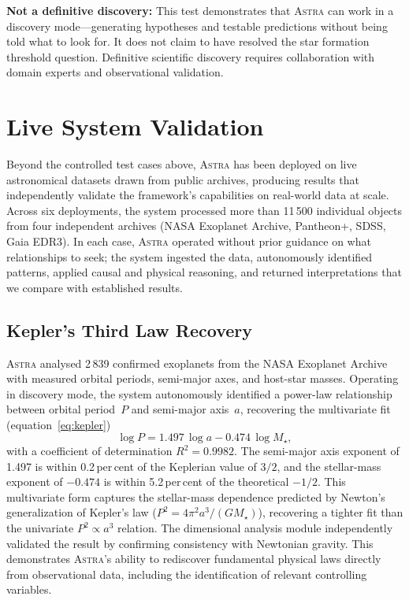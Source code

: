 \documentclass[usenatbib]{rasti}
\newcommand{\astra}{\textsc{Astra}\xspace}
\begin{document}
\textbf{Not a definitive discovery:}
This test demonstrates that \astra can work in a discovery mode---generating hypotheses and testable predictions without being told what to look for.
It does not claim to have resolved the star formation threshold question.
Definitive scientific discovery requires collaboration with domain experts and observational validation.

\section{Live System Validation}
\label{sec:live}

Beyond the controlled test cases above, \astra has been deployed on live astronomical datasets drawn from public archives, producing results that independently validate the framework's capabilities on real-world data at scale.
Across six deployments, the system processed more than 11\,500 individual objects from four independent archives (NASA Exoplanet Archive, Pantheon+, SDSS, Gaia EDR3).
In each case, \astra operated without prior guidance on what relationships to seek; the system ingested the data, autonomously identified patterns, applied causal and physical reasoning, and returned interpretations that we compare with established results.

\subsection{Kepler's Third Law Recovery}
\label{sec:live:kepler}

\astra analysed 2\,839 confirmed exoplanets from the NASA Exoplanet Archive with measured orbital periods, semi-major axes, and host-star masses.
Operating in discovery mode, the system autonomously identified a power-law relationship between orbital period~$P$ and semi-major axis~$a$, recovering the multivariate fit (equation~\ref{eq:kepler})
\begin{equation}
  \log P = 1.497\,\log a - 0.474\,\log M_{\star},
  \label{eq:kepler}
\end{equation}
with a coefficient of determination $R^{2} = 0.9982$.
The semi-major axis exponent of 1.497 is within 0.2\,per\,cent of the Keplerian value of $3/2$, and the stellar-mass exponent of $-0.474$ is within 5.2\,per\,cent of the theoretical $-1/2$.
This multivariate form captures the stellar-mass dependence predicted by Newton's generalization of Kepler's law ($P^{2} = 4\pi^{2} a^{3}/(GM_{\star})$), recovering a tighter fit than the univariate $P^{2} \propto a^{3}$ relation.
The dimensional analysis module independently validated the result by confirming consistency with Newtonian gravity.
This demonstrates \astra's ability to rediscover fundamental physical laws directly from observational data, including the identification of relevant controlling variables.
\end{document}
